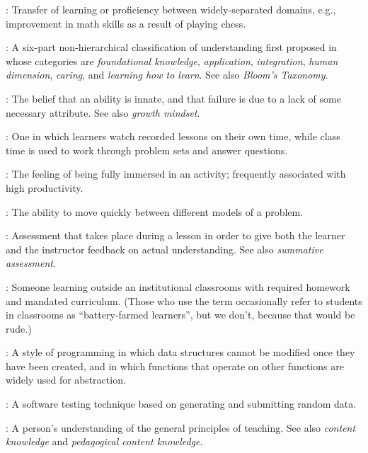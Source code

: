 \begin{description}
: Transfer of learning or proficiency
between widely-separated domains, e.g., improvement in math skills as a result
of playing chess.

: A six-part non-hierarchical
classification of understanding first proposed in \cite{Fink2013} whose
categories are \emph{foundational knowledge}, \emph{application},
\emph{integration}, \emph{human dimension}, \emph{caring}, and \emph{learning
  how to learn}. See also \emph{Bloom's Taxonomy}.

: The belief that an ability is innate,
and that failure is due to a lack of some necessary attribute. See also
\emph{growth mindset}.

: One in which learners watch
recorded lessons on their own time, while class time is used to work through
problem sets and answer questions.

: The feeling of being fully immersed in an activity;
frequently associated with high productivity.

: The ability to move
quickly between different models of a problem.

: Assessment that takes
place during a lesson in order to give both the learner and the instructor
feedback on actual understanding. See also \emph{summative assessment}.

: Someone learning outside an
institutional classrooms with required homework and mandated curriculum. (Those
who use the term occasionally refer to students in classrooms as
``battery-farmed learners'', but we don't, because that would be rude.)

: A style of programming
in which data structures cannot be modified once they have been created, and in
which functions that operate on other functions are widely used for abstraction.

: A software testing technique based on
generating and submitting random data.

: A
person's understanding of the general principles of teaching. See also
\emph{content knowledge} and \emph{pedagogical content knowledge}.


\end{description}
